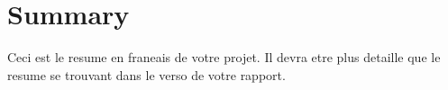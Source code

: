 \chapter*{Summary}

Ceci est le resume en franeais de votre projet. Il devra etre plus detaille que le resume se trouvant dans le verso de votre rapport.